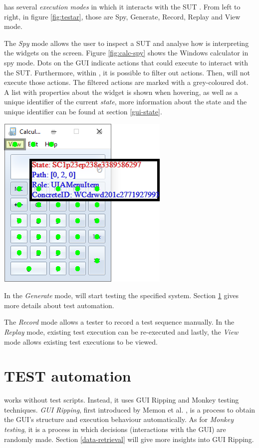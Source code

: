 \testar has several \emph{execution modes} in which it interacts with the SUT \cite{testar-manual}. From left to right, in figure \ref{fig:testar}, those are Spy, Generate, Record, Replay and View mode.

The \emph{Spy} mode allows the user to inspect a SUT and analyse how \testar is interpreting the widgets on the screen. Figure \ref{fig:calc-spy} shows the Windows calculator in spy mode. Dots on the GUI indicate actions that \testar could execute to interact with the SUT. Furthermore, within \testar, it is possible to filter out actions. Then, \testar will not execute those actions. The filtered actions are marked with a grey-coloured dot. A list with properties about the widget is shown when hovering, as well as a unique identifier of the current \emph{state}, more information about the state and the unique identifier can be found at section \ref{gui-state}.\par

\bigskip
\begingroup
\captionsetup{type=figure}
\includegraphics{images/calc-state.png}
\label{fig:calc-spy}
\endgroup

In the \emph{Generate} mode, \testar will start testing the specified system. Section \ref{testar-testauto} gives more details about \testar test automation.

The \emph{Record} mode allows a tester to record a test sequence manually. In the \emph{Replay} mode, existing test execution can be re-executed and lastly, the \emph{View} mode allows existing test executions to be viewed.

\newpage
\section{TEST automation} \label{testar-testauto}
\testar works without test scripts. Instead, it uses GUI Ripping and Monkey testing techniques. \emph{GUI Ripping}, first introduced by Memon et al. \cite{gui-ripping}, is a process to obtain the GUI's structure and execution behaviour automatically. As for \emph{Monkey testing}, it is a process in which decisions (interactions with the GUI) are randomly made. Section \ref{data-retrieval} will give more insights into GUI Ripping.

